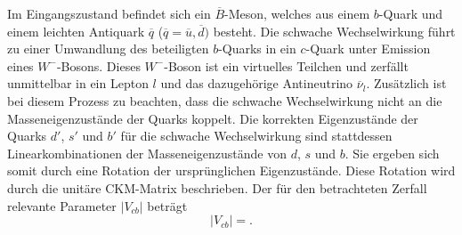 Im Eingangszustand befindet sich ein $\overline B$-Meson, welches aus einem $b$-Quark und einem leichten Antiquark $\overline q$ ($ \overline q = \overline u, \overline d)$ besteht.
Die schwache Wechselwirkung führt zu einer Umwandlung des beteiligten $b$-Quarks in ein $c$-Quark unter Emission eines $W^{-}$-Bosons. Dieses $W^{-}$-Boson ist ein virtuelles Teilchen und zerfällt unmittelbar in ein Lepton $l$ und das dazugehörige Antineutrino $\overline \nu_l$.  
Zusätzlich ist bei diesem Prozess zu beachten, dass die schwache Wechselwirkung nicht an die Masseneigenzustände der Quarks koppelt.
Die korrekten Eigenzustände der Quarks $d'$, $s'$ und $b'$ für die schwache Wechselwirkung sind stattdessen Linearkombinationen der Masseneigenzustände von $d$, $s$ und $b$. Sie ergeben sich somit durch eine Rotation der ursprünglichen Eigenzustände.
Diese Rotation wird durch die unitäre CKM-Matrix beschrieben.
Der für den betrachteten Zerfall relevante Parameter $\lvert V_{cb} \rvert$ beträgt \cite{Bigi2017441}
\begin{equation}
  \lvert V_{cb} \rvert = .
\end{equation}

